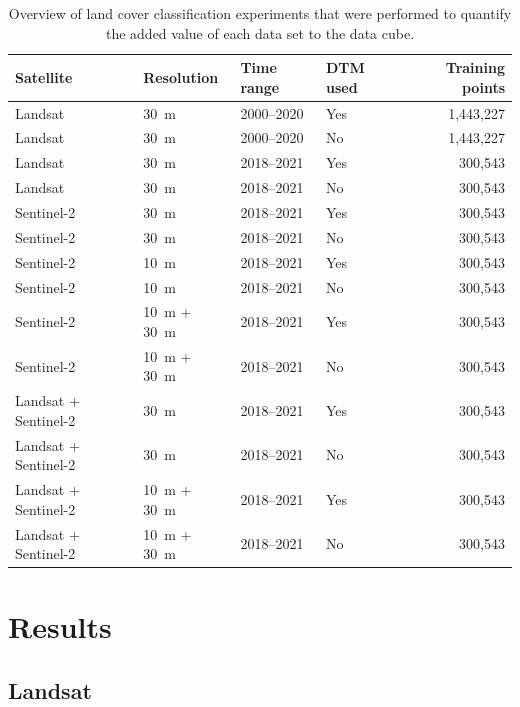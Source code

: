 \begin{table}[!hbt]
\centering
\caption{Overview of land cover classification experiments that were performed to quantify the added value of each data set to the data cube.}
\label{tab:landcover_experiments_methods}
\begin{tabular}{@{}llllr@{}}
\hline
Satellite    & Resolution & Time range & DTM used & Training points \\ 
\hline
Landsat    & 30~m        & 2000--2020  & Yes              & 1,443,227 \\
Landsat    & 30~m        & 2000--2020  & No               & 1,443,227 \\
Landsat    & 30~m        & 2018--2021  & Yes              & 300,543   \\
Landsat    & 30~m        & 2018--2021  & No               & 300,543   \\
Sentinel-2 & 30~m        & 2018--2021  & Yes              & 300,543   \\
Sentinel-2 & 30~m        & 2018--2021  & No               & 300,543   \\
Sentinel-2 & 10~m        & 2018--2021  & Yes              & 300,543   \\
Sentinel-2 & 10~m        & 2018--2021  & No               & 300,543   \\ 
Sentinel-2 & 10~m + 30~m  & 2018--2021  & Yes              & 300,543   \\
Sentinel-2 & 10~m + 30~m  & 2018--2021  & No               & 300,543   \\
Landsat + Sentinel-2 & 30~m        & 2018--2021  & Yes    & 300,543   \\
Landsat + Sentinel-2 & 30~m        & 2018--2021  & No     & 300,543   \\
Landsat + Sentinel-2 & 10~m + 30~m  & 2018--2021  & Yes    & 300,543   \\
Landsat + Sentinel-2 & 10~m + 30~m  & 2018--2021  & No     & 300,543   \\
\hline
\end{tabular}
\end{table}


\section*{Results}

\subsection*{Landsat}


